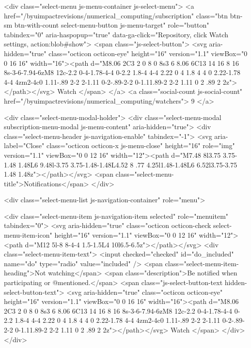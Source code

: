         <div class="select-menu js-menu-container js-select-menu">
          <a href="/byuimpactrevisions/numerical_computing/subscription"
            class="btn btn-sm btn-with-count select-menu-button js-menu-target" role="button" tabindex="0" aria-haspopup="true"
            data-ga-click="Repository, click Watch settings, action:blob#show">
            <span class="js-select-button">
              <svg aria-hidden="true" class="octicon octicon-eye" height="16" version="1.1" viewBox="0 0 16 16" width="16"><path d="M8.06 2C3 2 0 8 0 8s3 6 8.06 6C13 14 16 8 16 8s-3-6-7.94-6zM8 12c-2.2 0-4-1.78-4-4 0-2.2 1.8-4 4-4 2.22 0 4 1.8 4 4 0 2.22-1.78 4-4 4zm2-4c0 1.11-.89 2-2 2-1.11 0-2-.89-2-2 0-1.11.89-2 2-2 1.11 0 2 .89 2 2z"></path></svg>
              Watch
            </span>
          </a>
          <a class="social-count js-social-count" href="/byuimpactrevisions/numerical_computing/watchers">
            9
          </a>

        <div class="select-menu-modal-holder">
          <div class="select-menu-modal subscription-menu-modal js-menu-content" aria-hidden="true">
            <div class="select-menu-header js-navigation-enable" tabindex="-1">
              <svg aria-label="Close" class="octicon octicon-x js-menu-close" height="16" role="img" version="1.1" viewBox="0 0 12 16" width="12"><path d="M7.48 8l3.75 3.75-1.48 1.48L6 9.48l-3.75 3.75-1.48-1.48L4.52 8 .77 4.25l1.48-1.48L6 6.52l3.75-3.75 1.48 1.48z"></path></svg>
              <span class="select-menu-title">Notifications</span>
            </div>

              <div class="select-menu-list js-navigation-container" role="menu">

                <div class="select-menu-item js-navigation-item selected" role="menuitem" tabindex="0">
                  <svg aria-hidden="true" class="octicon octicon-check select-menu-item-icon" height="16" version="1.1" viewBox="0 0 12 16" width="12"><path d="M12 5l-8 8-4-4 1.5-1.5L4 10l6.5-6.5z"></path></svg>
                  <div class="select-menu-item-text">
                    <input checked="checked" id="do_included" name="do" type="radio" value="included" />
                    <span class="select-menu-item-heading">Not watching</span>
                    <span class="description">Be notified when participating or @mentioned.</span>
                    <span class="js-select-button-text hidden-select-button-text">
                      <svg aria-hidden="true" class="octicon octicon-eye" height="16" version="1.1" viewBox="0 0 16 16" width="16"><path d="M8.06 2C3 2 0 8 0 8s3 6 8.06 6C13 14 16 8 16 8s-3-6-7.94-6zM8 12c-2.2 0-4-1.78-4-4 0-2.2 1.8-4 4-4 2.22 0 4 1.8 4 4 0 2.22-1.78 4-4 4zm2-4c0 1.11-.89 2-2 2-1.11 0-2-.89-2-2 0-1.11.89-2 2-2 1.11 0 2 .89 2 2z"></path></svg>
                      Watch
                    </span>
                  </div>
                </div>

